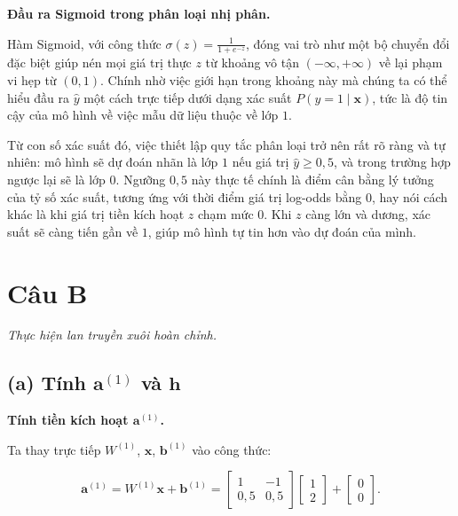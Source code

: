 \documentclass[12pt,a4paper]{article}
\begin{document}
\medskip

\textbf{Đầu ra Sigmoid trong phân loại nhị phân.}

Hàm Sigmoid, với công thức $\sigma(z) = \tfrac{1}{1+e^{-z}}$, đóng vai trò như một bộ chuyển đổi đặc biệt giúp nén mọi giá trị thực $z$ từ khoảng vô tận $(-\infty, +\infty)$ về lại phạm vi hẹp từ $(0,1)$. Chính nhờ việc giới hạn trong khoảng này mà chúng ta có thể hiểu đầu ra $\hat{y}$ một cách trực tiếp dưới dạng xác suất $P(y=1 \mid \mathbf{x})$, tức là độ tin cậy của mô hình về việc mẫu dữ liệu thuộc về lớp $1$.

Từ con số xác suất đó, việc thiết lập quy tắc phân loại trở nên rất rõ ràng và tự nhiên: mô hình sẽ dự đoán nhãn là lớp $1$ nếu giá trị $\hat{y} \ge 0,5$, và trong trường hợp ngược lại sẽ là lớp $0$. Ngưỡng $0,5$ này thực tế chính là điểm cân bằng lý tưởng của tỷ số xác suất, tương ứng với thời điểm giá trị log-odds bằng $0$, hay nói cách khác là khi giá trị tiền kích hoạt $z$ chạm mức $0$. Khi $z$ càng lớn và dương, xác suất sẽ càng tiến gần về $1$, giúp mô hình tự tin hơn vào dự đoán của mình.

\section*{Câu B}

\noindent\textit{Thực hiện lan truyền xuôi hoàn chỉnh.}

\bigskip
\subsection*{(a) Tính $\mathbf{a}^{(1)}$ và $\mathbf{h}$}

\noindent\textbf{Tính tiền kích hoạt $\mathbf{a}^{(1)}$.}

Ta thay trực tiếp $W^{(1)}$, $\mathbf{x}$, $\mathbf{b}^{(1)}$ vào công thức:

\[
  \mathbf{a}^{(1)}
  = W^{(1)}\mathbf{x} + \mathbf{b}^{(1)}
  = \begin{bmatrix} 1 & -1 \\ 0{,}5 & 0{,}5 \end{bmatrix}
    \begin{bmatrix} 1 \\ 2 \end{bmatrix}
  + \begin{bmatrix} 0 \\ 0 \end{bmatrix}.
\]
\end{document}
